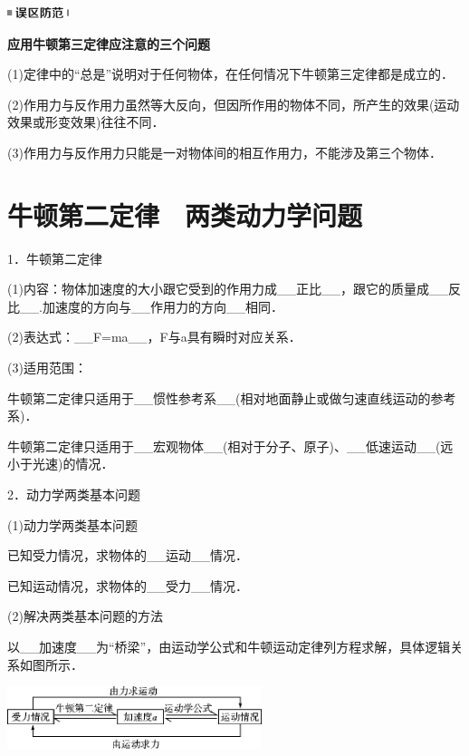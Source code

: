 \begin{center}\includegraphics[width=0.70833in,height=0.125in]{media/image34.png}

\textbf{应用牛顿第三定律应注意的三个问题}
\end{center}


(1)定律中的``总是''说明对于任何物体，在任何情况下牛顿第三定律都是成立的．

(2)作用力与反作用力虽然等大反向，但因所作用的物体不同，所产生的效果(运动效果或形变效果)往往不同．

(3)作用力与反作用力只能是一对物体间的相互作用力，不能涉及第三个物体．
\newpage
\section{牛顿第二定律　两类动力学问题}


1．牛顿第二定律

(1)内容：物体加速度的大小跟它受到的作用力成\_\_正比\_\_，跟它的质量成\_\_反比\_\_.加速度的方向与\_\_作用力的方向\_\_相同．

(2)表达式：\_\_F=ma\_\_，F与a具有瞬时对应关系．

(3)适用范围：

牛顿第二定律只适用于\_\_惯性参考系\_\_(相对地面静止或做匀速直线运动的参考系)．

牛顿第二定律只适用于\_\_宏观物体\_\_(相对于分子、原子)、\_\_低速运动\_\_(远小于光速)的情况．

2．动力学两类基本问题

(1)动力学两类基本问题

已知受力情况，求物体的\_\_运动\_\_情况．

已知运动情况，求物体的\_\_受力\_\_情况．

(2)解决两类基本问题的方法

以\_\_加速度\_\_为``桥梁''，由运动学公式和牛顿运动定律列方程求解，具体逻辑关系如图所示．

\begin{center}\includegraphics[width=2.92708in,height=0.71875in]{media/image99.png}\end{center}

\newpage
